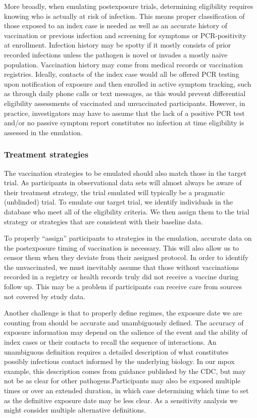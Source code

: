 \documentclass[11pt]{article}
\begin{document}
More broadly, when emulating postexposure trials, determining eligibility requires knowing who is actually at risk of infection. This means proper classification of those exposed to an index case is needed as well as an accurate history of vaccination or previous infection and screening for symptoms or PCR-positivity at enrollment. Infection history may be spotty if it mostly consists of prior recorded infections unless the pathogen is novel or invades a mostly naive population. Vaccination history may come from medical records or vaccination registries. Ideally, contacts of the index case would all be offered PCR testing upon notification of exposure and then enrolled in active symptom tracking, such as through daily phone calls or text messages, as this would prevent differential eligibility assessments of vaccinated and unvaccinated participants. However, in practice, investigators may have to assume that the lack of a positive PCR test and/or no passive symptom report constitutes no infection at time eligibility is assessed in the emulation.

\subsubsection*{Treatment strategies}
The vaccination strategies to be emulated should also match those in the target trial. As participants in observational data sets will almost always be aware of their treatment strategy, the trial emulated will typically be a pragmatic (unblinded) trial. To emulate our target trial, we identify individuals in the database who meet all of the eligibility criteria. We then assign them to the trial strategy or strategies that are consistent with their baseline data.

To properly ``assign'' participants to strategies in the emulation, accurate data on the postexposure timing of vaccination is necessary. This will also allow us to censor them when they deviate from their assigned protocol. In order to identify the unvaccinated, we must inevitably assume that those without vaccinations recorded in a registry or health records truly did not receive a vaccine during follow up. This may be a problem if participants can receive care from sources not covered by study data. 

Another challenge is that to properly define regimes, the exposure date we are counting from should be accurate and unambiguously defined. The accuracy of exposure information may depend on the salience of the event and the ability of index cases or their contacts to recall the sequence of interactions. An unambiguous definition requires a detailed description of what constitutes possibly infectious contact informed by the underlying biology. In our mpox example, this description comes from guidance published by the CDC, but may not be as clear for other pathogens.Participants may also be exposed multiple times or over an extended duration, in which case determining which time to set as the definitive exposure date may be less clear. As a sensitivity analysis we might consider multiple alternative definitions.
\end{document}
